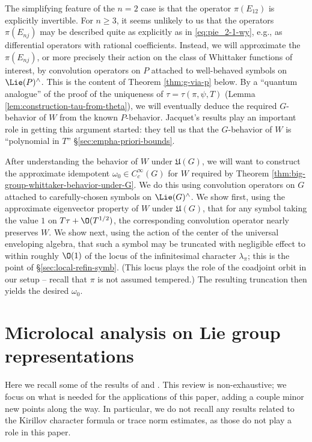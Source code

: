 The simplifying feature of the $n=2$ case is that the operator $\pi(E_{12})$ is explicitly invertible.  For $n \geq 3$, it seems unlikely to us that the operators $\pi(E_{n j})$ may be described quite as explicitly as in \eqref{eq:pie_2-1-wy}, e.g., as differential operators with rational coefficients.  Instead, we will approximate the $\pi(E_{n j})$, or more precisely their action on the class of Whittaker functions of interest, by convolution operators on $P$ attached to well-behaved symbols on $\Lie(P)^\wedge$.  This is the content of Theorem \ref{thm:g-via-p} below.  By a ``quantum analogue'' of the proof of the uniqueness of $\tau = \tau(\pi, \psi, T)$ (Lemma \ref{lem:construction-tau-from-theta}), we will eventually deduce the required $G$-behavior of $W$ from the known $P$-behavior.  Jacquet's results play an important role in getting this argument started: they tell us that the $G$-behavior of $W$ is ``polynomial in $T$'' \S\ref{sec:empha-priori-bounds}.

After understanding the behavior of $W$ under $\mathfrak{U}(G)$, we will want to construct the approximate idempotent $\omega_0 \in C_c^\infty(G)$ for $W$ required by Theorem \ref{thm:big-group-whittaker-behavior-under-G}.  We do this using convolution operators on $G$ attached to carefully-chosen symbols on $\Lie(G)^\wedge$.  We show first, using the approximate eigenvector property of $W$ under $\mathfrak{U}(G)$, that for any symbol taking the value $1$ on $T \tau + \O(T^{1/2})$, the corresponding convolution operator nearly preserves $W$.  We show next, using the action of the center of the universal enveloping algebra, that such a symbol may be truncated with negligible effect to within roughly $\O(1)$ of the locus of the infinitesimal character $\lambda_\pi$; this is the point of  \S\ref{sec:local-refin-symb}.  (This locus plays the role of the coadjoint orbit in our setup -- recall that $\pi$ is not assumed tempered.)  The resulting truncation then yields the desired $\omega_0$.



\section{Microlocal analysis on Lie group representations}
Here we recall some of the results of \cite[Parts 1 and 2]{nelson-venkatesh-1} and \cite[\S8-\S10]{2020arXiv201202187N}.  This review is non-exhaustive; we focus on what is needed for the applications of this paper, adding a couple minor new points along the way.  In particular, we do not recall any results related to the Kirillov character formula or trace norm estimates, as those do not play a role in this paper.

